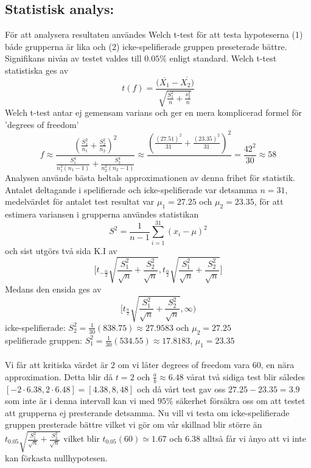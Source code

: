 \documentclass[11p]{article}
\begin{document}
\subsection{Statistisk analys:}
För att analysera resultaten användes Welch t-test för att testa hypoteserna (1) både grupperna är lika och (2) icke-spelifierade gruppen preseterade bättre. Signifikans nivån av testet valdes till $0.05\%$ enligt standard. Welch t-test statistiska ges av
\[ t(f)=\frac{(\overline{X_1}-\overline{X_2)}}{\sqrt{\frac{S_1^2}{n}+\frac{s_2^2}{n}}}
\]
Welch t-test antar ej gemensam varians och ger en mera komplicerad formel för 'degrees of freedom'
\[f\approx \frac{(\frac{S^2_1}{n_1}+\frac{S^2_2}{n_2})^2}{\frac{S_1^4}{n_1^2(n_1-1)}+\frac{S_2^4}{n_2^2(n_2-1)}}\approx \frac{(\frac{(27.51)^2}{31}+\frac{(23.35)^2}{31})^2}{}=\frac{42^2}{30}\approx 58
\]
Analysen använde bästa heltals approximationen av denna frihet för statistik. Antalet deltagande i spelifierade och icke-spelifierade var detsamma $n=31$, medelvärdet för antalet test resultat var $\mu_1=27.25$ och $\mu_2=23.35$, för att estimera variansen i grupperna användes statistikan
\[S^2=\frac{1}{n-1}\sum_{i=1}^{31}(x_i-\mu)^2
\]
och sist utgörs två sida K.I av
\[\bigg[t_{-\frac{\alpha}{2}}\sqrt{\frac{S_1^2}{\sqrt{n}}+\frac{S_2^2}{\sqrt{n}}},t_{\frac{\alpha}{2}}\sqrt{\frac{S_1^2}{\sqrt{n}}+\frac{S_2^2}{\sqrt{n}}}\bigg]
\]
Medans den ensida ges av
\[\bigg[t_{\frac{\alpha}{2}}\sqrt{\frac{S_1^2}{\sqrt{n}}+\frac{S_2^2}{\sqrt{n}}},\infty\bigg)
\]
icke-spelifierade: $S_2^2=\frac{1}{30}(838.75)\approx 27.9583$ och $\mu_2=27.25$ \\
spelifierade gruppen: $S^2_1=\frac{1}{30}(534.55)\approx 17.8183$, $\mu_1=23.35$
\\
\\
Vi får att kritiska värdet är $2$ om vi låter degrees of freedom vara 60, en nära approximation. Detta blir då $t=2$ och $\frac{a}{b}\approx 6.48$ vårat två sidiga test blir således $[-2\cdot6.38,2\cdot6.48]=[4.38,8,48]$ och då vårt test gav oss $27.25-23.35=3.9$ som inte är i denna intervall kan vi med $95\%$ säkerhet försäkra oss om att testet att grupperna ej presterande detsamma. Nu vill vi testa om icke-spelifierade gruppen presterade bättre vilket vi gör om vår skillnad blir större än $t_{0.05}\sqrt{\frac{S_1^2}{\sqrt{n}}+\frac{S_2^2}{\sqrt{n}}}$ vilket blir $t_{0.05}(60)\simeq 1.67$ och $6.38$ alltså får vi ånyo att vi inte kan förkasta nullhypotesen.
\\
\end{document}
